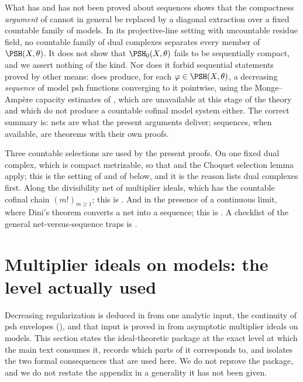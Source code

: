 \begin{warning}{What has and has not been proved about sequences}
 shows that the compactness
\emph{argument} of  cannot in general
be replaced by a diagonal extraction over a fixed countable family of
models.  In its projective-line setting with uncountable residue field, no
countable family of dual complexes separates every member of
$\PSH(X,\theta)$.  It does not show that
$\PSH_0(X,\theta)$ fails to be sequentially compact, and we assert
nothing of the kind.  Nor does it forbid sequential statements proved by
other means:  does produce, for each
$\varphi\in\PSH(X,\theta)$, a decreasing \emph{sequence} of model psh
functions converging to it pointwise, using the Monge--Amp\`ere capacity
estimates of , which are unavailable at this stage
of the theory and which do not produce a countable cofinal model system
either.  The correct summary is: nets are what the present arguments
deliver; sequences, when available, are theorems with their own proofs.
\end{warning}

\begin{remark}
\label{rem:ch22-legitimate-sequences}
Three countable selections are used by the present proofs.  On one fixed dual complex, which is
compact
metrizable, so that  and the Choquet selection
lemma  apply; this is the setting of
 and of
 below, and it is the reason
 lists dual complexes first.  Along the
divisibility net of multiplier ideals, which has the countable cofinal chain
$(m!)_{m\geq1}$; this is .  And in the
presence of a continuous limit, where Dini's theorem converts a net into a
sequence; this is .  A
checklist of the general net-versus-sequence traps is
.
\end{remark}

\section{Multiplier ideals on models: the level actually used}
\label{sec:ch22-multiplier}

Decreasing regularization is deduced in
 from one analytic input, the continuity of
psh envelopes (), and that input is proved
in  from asymptotic multiplier ideals on models.
This section states the ideal-theoretic package at the exact level at which
the main text consumes it, records which parts of
 it corresponds to, and isolates the two formal
consequences that are used here.  We do not reprove the package, and we do
not restate the appendix in a generality it has not been given.

